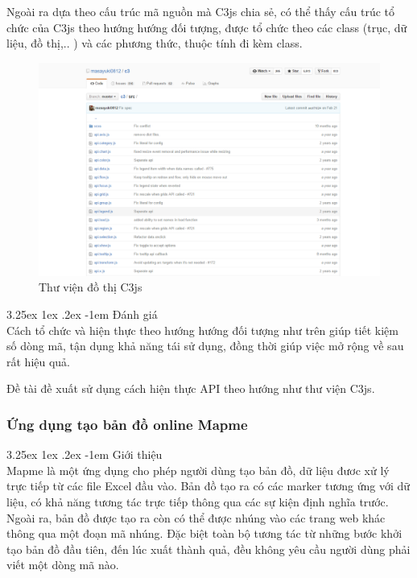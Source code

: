 \documentclass[12pt,a4paper]{article}
\makeatletter
\newcommand{\myparagraph}[1]{\paragraph{#1}\mbox{}\\} %
\renewcommand\paragraph{\@startsection{paragraph}{5}{\z@}%
  {3.25ex \@plus1ex \@minus.2ex}%
  {-1em}%
  {\normalfont\normalsize\bfseries}}
\makeatother
\begin{document}
Ngoài ra dựa theo cấu trúc mã nguồn mà C3js chia sẻ, có thể thấy cấu trúc tổ chức của C3js theo hướng hướng đối tượng, được tổ chức theo các class (trục, dữ liệu, đồ thị,.. ) và các phương thức, thuộc tính đi kèm class.

\begin{figure}[htp]
	\begin{center}
    \includegraphics[scale=.4]{image/c3source}
    \caption{Thư viện đồ thị C3js}
    \label{fig:c3source}
	\end{center}
\end{figure}

\myparagraph{Đánh giá}
Cách tổ chức và hiện thực theo hướng hướng đối tượng như trên giúp tiết kiệm số dòng mã, tận dụng khả năng tái sử dụng, đồng thời giúp việc mở rộng về sau rất hiệu quả.

Đề tài đề xuất sử dụng cách hiện thực API theo hướng như thư viện C3js.

\subsubsection{Ứng dụng tạo bản đồ online Mapme}
\myparagraph{Giới thiệu}
Mapme\cite{mapme} là một ứng dụng cho phép người dùng tạo bản đồ, dữ liệu đươc xử lý trực tiếp từ các file Excel đầu vào. Bản đồ tạo ra có các marker tương ứng với dữ liệu, có khả năng tương tác trực tiếp thông qua các sự kiện định nghĩa trước. Ngoài ra, bản đồ được tạo ra còn có thể được nhúng vào các trang web khác thông qua một đoạn mã nhúng. Đặc biệt toàn bộ tương tác từ những bước khởi tạo bản đồ đầu tiên, đến lúc xuất thành quả, đều không yêu cầu người dùng phải viết một dòng mã nào.
\end{document}
